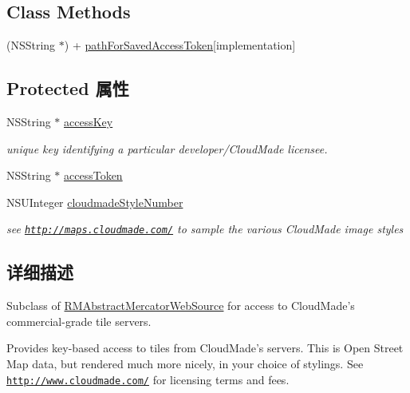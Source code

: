 \subsection*{Class Methods}
\begin{DoxyCompactItemize}
\item 
(N\-S\-String $\ast$) + \hyperlink{interface_r_m_cloud_made_map_source_a472e70ed7bd9c453f9c536bccec94ef3}{path\-For\-Saved\-Access\-Token}{\ttfamily  \mbox{[}implementation\mbox{]}}
\end{DoxyCompactItemize}
\subsection*{Protected 属性}
\begin{DoxyCompactItemize}
\item 
N\-S\-String $\ast$ \hyperlink{interface_r_m_cloud_made_map_source_a4efefbc741e320d977cf04e9a96e02d0}{access\-Key}
\begin{DoxyCompactList}\small\item\em unique key identifying a particular developer/\-Cloud\-Made licensee. \end{DoxyCompactList}\item 
N\-S\-String $\ast$ \hyperlink{interface_r_m_cloud_made_map_source_ac3deb46e005ea4bdf67c0e32b4ab7406}{access\-Token}
\item 
N\-S\-U\-Integer \hyperlink{interface_r_m_cloud_made_map_source_a8fb92e3c3ae01146bc6a02bb437caec1}{cloudmade\-Style\-Number}
\begin{DoxyCompactList}\small\item\em see \href{http://maps.cloudmade.com/}{\tt http\-://maps.\-cloudmade.\-com/} to sample the various Cloud\-Made image styles \end{DoxyCompactList}\end{DoxyCompactItemize}


\subsection{详细描述}
Subclass of \hyperlink{interface_r_m_abstract_mercator_web_source}{R\-M\-Abstract\-Mercator\-Web\-Source} for access to Cloud\-Made's commercial-\/grade tile servers. 

Provides key-\/based access to tiles from Cloud\-Made's servers. This is Open Street Map data, but rendered much more nicely, in your choice of stylings. See \href{http://www.cloudmade.com/}{\tt http\-://www.\-cloudmade.\-com/} for licensing terms and fees. 

